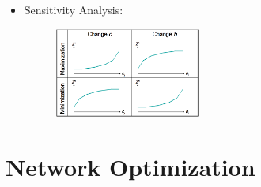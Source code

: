 \documentclass[10pt, twocolumn]{article}
\begin{document}
\begin{itemize}
\begin{table}[h]
\begin{tabular}{|c|c|c|}
\end{tabular}
\end{table} 
\item Sensitivity Analysis:
\begin{figure}[!h]
\centering
\includegraphics[width=0.45\textwidth]{sensitivity}
\end{figure}
\end{itemize}

\section*{Network Optimization}
\end{document}
